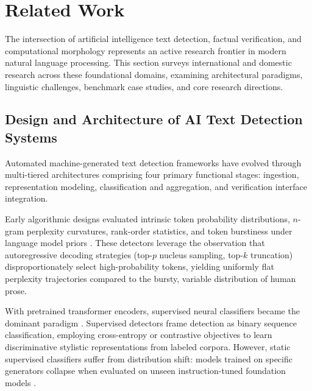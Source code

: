 \section{Related Work}
\label{sec:literature_review}

The intersection of artificial intelligence text detection, factual verification, and computational morphology represents an active research frontier in modern natural language processing. This section surveys international and domestic research across these foundational domains, examining architectural paradigms, linguistic challenges, benchmark case studies, and core research directions.

\subsection{Design and Architecture of AI Text Detection Systems}
\label{sec:design_architecture}

Automated machine-generated text detection frameworks have evolved through multi-tiered architectures comprising four primary functional stages: ingestion, representation modeling, classification and aggregation, and verification interface integration.

Early algorithmic designs evaluated intrinsic token probability distributions, $n$-gram perplexity curvatures, rank-order statistics, and token burstiness under language model priors \cite{wang2024raid}. These detectors leverage the observation that autoregressive decoding strategies (top-$p$ nucleus sampling, top-$k$ truncation) disproportionately select high-probability tokens, yielding uniformly flat perplexity trajectories compared to the bursty, variable distribution of human prose.

With pretrained transformer encoders, supervised neural classifiers became the dominant paradigm \cite{vaswani2017attention, sagyndyk2025kazroberta}. Supervised detectors frame detection as binary sequence classification, employing cross-entropy or contrastive objectives to learn discriminative stylistic representations from labeled corpora. However, static supervised classifiers suffer from distribution shift: models trained on specific generators collapse when evaluated on unseen instruction-tuned foundation models \cite{wang2024raid, khurana2023contrastive}.

